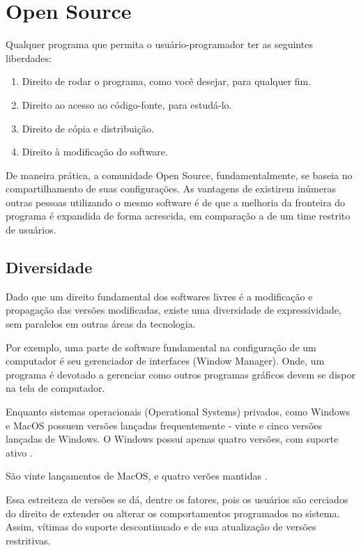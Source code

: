 \documentclass[
12pt,				%
openright,			%
oneside,			%
a4paper,			%
english,			%
french,				%
spanish,			%
brazil,				%
]{abntex2}
\begin{document}
\section{Open Source}
\label{sec:opensource}
Qualquer programa que permita o usuário-programador ter as seguintes
liberdades:

\begin{enumerate}
\item Direito de rodar o programa, como você desejar, para qualquer fim.
\item Direito ao acesso ao código-fonte, para estudá-lo.
\item Direito de cópia e distribuição.
\item Direito à modificação do software.
\end{enumerate}

De maneira prática, a comunidade Open Source, fundamentalmente, se baseia no compartilhamento de suas configurações. As vantagens de existirem inúmeras outras pessoas utilizando o mesmo software é de que a melhoria da fronteira do programa é expandida de forma acrescida, em comparação a de um time restrito de usuários.

\subsection{Diversidade}
\label{sec:diversidade}

Dado que um direito fundamental dos softwares livres é a modificação e propagação das versões modificadas, existe uma diversidade de expressividade, sem paralelos em outras áreas da tecnologia.

Por exemplo, uma parte de software fundamental na configuração de um computador é seu gerenciador de interfaces (Window Manager). Onde, um programa é devotado a gerenciar como outros programas gráficos devem se dispor na tela de computador.

Enquanto sistemas operacionais (Operational Systems) privados, como Windows e MacOS possuem versões lançadas frequentemente - vinte e cinco versões lançadas de Windows. O Windows possui apenas quatro versões, com suporte ativo \cite{wikipedia_2021W}.

São vinte lançamentos de MacOS, e quatro verões mantidas \cite{wikipedia_2021Mac}.

Essa estreiteza de versões se dá, dentre os fatores, pois os usuários são cerciados do direito de extender ou alterar os comportamentos programados no sistema. Assim, vítimas do suporte descontinuado e de sua atualização de versões restritivas.
\end{document}
